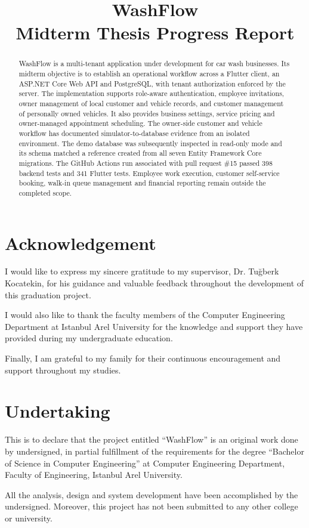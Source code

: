 \documentclass[12pt]{report}
\title{WashFlow\\Midterm Thesis Progress Report}
\begin{document}
\hypersetup{pageanchor=false}
\maketitle
\hypersetup{pageanchor=true}

\begin{preliminary}
\chapter*{Acknowledgement}
I would like to express my sincere gratitude to my supervisor, Dr. Tuğberk Kocatekin, for his guidance and valuable feedback throughout the development of this graduation project.

I would also like to thank the faculty members of the Computer Engineering Department at Istanbul Arel University for the knowledge and support they have provided during my undergraduate education.

Finally, I am grateful to my family for their continuous encouragement and support throughout my studies.

\chapter*{Undertaking}
This is to declare that the project entitled ``WashFlow'' is an original work done by undersigned, in partial fulfillment of the requirements for the degree ``Bachelor of Science in Computer Engineering'' at Computer Engineering Department, Faculty of Engineering, Istanbul Arel University.

All the analysis, design and system development have been accomplished by the undersigned. Moreover, this project has not been submitted to any other college or university.

\newpage
\begin{abstract}
WashFlow is a multi-tenant application under development for car wash businesses. Its midterm objective is to establish an operational workflow across a Flutter client, an ASP.NET Core Web API and PostgreSQL, with tenant authorization enforced by the server. The implementation supports role-aware authentication, employee invitations, owner management of local customer and vehicle records, and customer management of personally owned vehicles. It also provides business settings, service pricing and owner-managed appointment scheduling. The owner-side customer and vehicle workflow has documented simulator-to-database evidence from an isolated environment. The demo database was subsequently inspected in read-only mode and its schema matched a reference created from all seven Entity Framework Core migrations. The GitHub Actions run associated with pull request \#15 passed 398 backend tests and 341 Flutter tests. Employee work execution, customer self-service booking, walk-in queue management and financial reporting remain outside the completed scope.
\end{abstract}


\end{preliminary}
\end{document}
